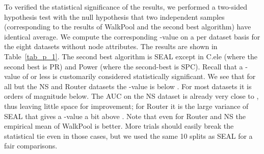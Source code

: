 \documentclass[11pt]{article}
\newcommand{\UPDATE}[1]{\textcolor{WowColor}{{#1}}}
\renewcommand{\UPDATE}[1]{#1}
\begin{document}
\UPDATE{To verified the statistical significance of the results, we performed a two-sided hypothesis test with the null hypothesis that two independent samples (corresponding to the results of WalkPool and the second best algorithm) have identical average. We compute the corresponding -value on a per dataset basis for the eight datasets without node attributes. The results are shown in Table~\ref{tab_p_1}. The second best algorithm is SEAL except in C.ele (where the second best is PR) and Power (where the second-best is SPC). 
Recall that a -value of  or less is customarily considered statistically significant. We see that for all but the NS and Router datasets the -value is below . For most datasets it is orders of magnitude below. The AUC on the NS dataset is already very close to , thus leaving little space for improvement; for Router it is the large variance of SEAL that gives a -value a bit above . Note that even for Router and NS the empirical mean of WalkPool is better. More trials should easily break the statistical tie even in those cases, but we used the same 10 splits as SEAL for a fair comparisons.}

\addtolength{\tabcolsep}{-3pt}
\begin{table}[!]
\centering
{}
\caption{-value by comparing WP and second best algorithm on eight datasets with no attributes.}
\label{tab_p_1}
\end{table}
\addtolength{\tabcolsep}{3pt}
\end{document}
